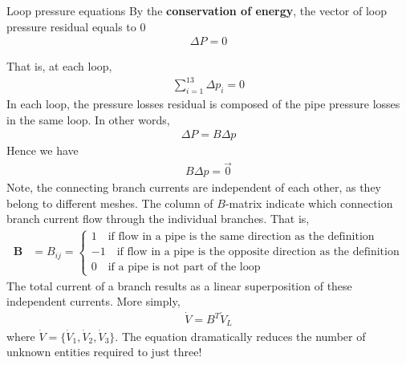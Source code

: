 \documentclass[xcolor=dvipsnames]{beamer}
\newcommand{\dV}{\dot{V}}
\begin{document}
\begin{frame}[fragile,shrink=30]{Loop pressure equations}
By the \textbf{conservation of energy}, the vector of loop pressure residual equals to 0
	\begin{align}\label{eq2}
	\Delta P = 0 
	\end{align}

That is, at each loop,
\begin{align}
\sum^{13}_{i=1}\Delta p_i = 0
\end{align}
In each loop, the pressure losses residual is composed of the pipe pressure losses in the same loop. In other words,
\begin{align}\label{eq3}
	\Delta P = B \Delta p
\end{align}
Hence we have 
\begin{align}\label{eq4}
	B\Delta p = \vec{0}
\end{align}
Note, the connecting branch currents are independent of each other, as they belong to different meshes. The column
of $B$-matrix indicate which connection branch current flow through the individual branches. That is,
\begin{align*}
\mathbf{B}&=B_{ij}
	= \begin{cases}
		1\quad \text{if flow in a pipe is the same direction as the definition}\\
		-1\quad \text{if flow in a pipe is the opposite direction as the definition}\\
		0\quad \text{if a pipe is not part of the loop}
	\end{cases}
\end{align*}
 The total current of a branch results as 
a linear superposition of these independent currents. More simply,
\begin{align}\label{eq5}
	\dV = B^T \dV_L
\end{align}
where $\dV=\{\dV_1, \dV_2, \dV_3\}.$ The equation dramatically reduces the number of unknown entities required to just three!
\end{frame}
\end{document}

